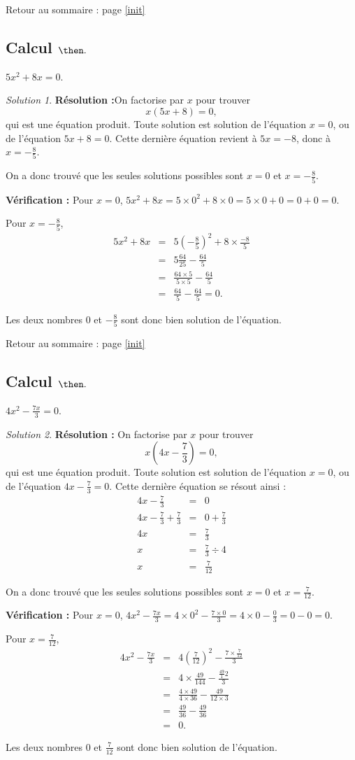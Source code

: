 \documentclass[14pt]{article}
\theoremstyle{remark}
\newtheorem*{sol}{Solution}
\newcounter{n}
\renewcommand{\it}{Retour au sommaire : page \ref{init}
	\subsection{Calcul $ \mathbf{ \then}.$}\label{\then} \stepcounter{n} }
\theoremstyle{plain}
\begin{document}
\it $5x^2+8x=0$. 
\begin{sol}
\textbf{Résolution :}On factorise par $x$ pour trouver \[x(5x+8)=0,\]
qui est une équation produit. Toute solution est solution de l'équation $x=0$, ou de l'équation $5x+8=0$. Cette dernière équation revient à $5x=-8$, donc à $x=-\frac85$.

On a donc trouvé que les seules solutions possibles sont $x=0$ et $x=-\frac85$. 


\textbf{Vérification :} Pour $x=0$, $5x^2+8x=5\times 0^2+8\times0=5\times 0+0=0+0=0$.

Pour $x=-\frac85$, \begin{eqnarray*}5x^2+8x&=&5\left(-\frac85\right)^2 + 8\times \frac{-8}5\\
&=& 5 \frac{64}{25} - \frac{64}5 \\
&=& \frac{64\times 5}{5\times 5} - \frac{64}5\\
&=& \frac{64}5-\frac{64}5=0.\end{eqnarray*}

Les deux nombres $0$ et $-\frac85$ sont donc bien solution de l'équation.
\end{sol}
\it $4x^2-\frac{7x}3=0$. 
\begin{sol}
\textbf{Résolution :} On factorise par $x$ pour trouver \[x(4x-\frac73)=0,\]
qui est une équation produit. Toute solution est solution de l'équation $x=0$, ou de l'équation $4x-\frac73=0$. 
Cette dernière équation se résout ainsi : 
\begin{eqnarray*}
4x-\frac73 &=& 0 \\
4x-\frac73+\frac73 &=& 0+\frac73 \\
4x &=& \frac73 \\
x &=& \frac73\div 4\\
x&=& \frac7{12}\end{eqnarray*}

On a donc trouvé que les seules solutions possibles sont $x=0$ et $x=\frac7{12}$. 


\textbf{Vérification :} Pour $x=0$, $4x^2-\frac{7x}3
= 4\times 0^2 - \frac{7\times0}3 = 4\times 0 - \frac03 = 0-0=0$.

Pour $x=\frac7{12}$, \begin{eqnarray*}4x^2-\frac{7x}3&=&
4\left(\frac7{12}\right)^2 - \frac{7\times\frac{7}{12}}3 \\
&=& 4\times \frac{49}{144} - \frac{\frac{49}12}3 \\
&=& \frac{4\times 49}{4\times 36} - \frac{49}{12\times3}\\
&=& \frac{49}{36}-\frac{49}{36}\\
&=&0.
\end{eqnarray*}

Les deux nombres $0$ et $\frac7{12}$ sont donc bien solution de l'équation.
\end{sol}
	
\end{document}
